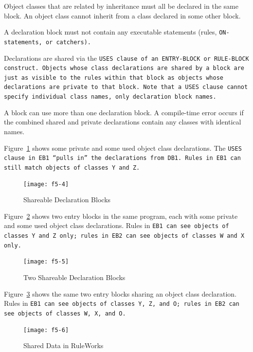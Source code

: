 \begin{note}
  Object classes that are related by inheritance must all be declared
  in the same block. An object class cannot inherit from a class
  declared in some other block.
\end{note}

A declaration block must not contain any executable statements (rules,
\tt{ON-} statements, or catchers).

Declarations are shared via the \tt{USES} clause of an
\tt{ENTRY-BLOCK} or \tt{RULE-BLOCK} construct.  Objects whose class
declarations are shared by a block are just as visible to the rules
within that block as objects whose declarations are private to that
block. Note that a \tt{USES} clause cannot specify individual class
names, only declaration block names.

A block can use more than one declaration block. A compile-time error
occurs if the combined shared and private declarations contain any
classes with identical names.

Figure~\ref{f:5-4} shows some private and some used object class
declarations. The \tt{USES} clause in \tt{EB1} ``pulls in'' the
declarations from \tt{DB1}.  Rules in \tt{EB1} can still match objects
of classes \tt{Y} and \tt{Z}.

\begin{figure}[h]
  \centering
  \texttt{[image: f5-4]}
  \caption{Shareable Declaration Blocks}
  \label{f:5-4}
\end{figure}

Figure~\ref{f:5-5} shows two entry blocks in the same program, each
with some private and some used object class declarations. Rules in
\tt{EB1} can see objects of classes \tt{Y} and \tt{Z} only; rules in
\tt{EB2} can see objects of classes \tt{W} and \tt{X} only.

\begin{figure}[h]
  \centering
  \texttt{[image: f5-5]}
  \caption{Two Shareable Declaration Blocks}
  \label{f:5-5}
\end{figure}

Figure~\ref{f:5-6} shows the same two entry blocks sharing an object
class declaration. Rules in \tt{EB1} can see objects of classes
\tt{Y}, \tt{Z}, and \tt{O}; rules in \tt{EB2} can see objects of
classes \tt{W}, \tt{X}, and \tt{O}.

\begin{figure}[h]
  \centering
  \texttt{[image: f5-6]}
  \caption{Shared Data in RuleWorks}
  \label{f:5-6}
\end{figure}

